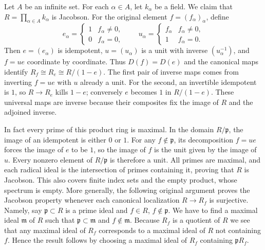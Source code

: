 \begin{example}
\label{editorial-source-example-infinite-product-fields-jacobson}
Let $A$ be an infinite set.
For each $\alpha \in A$, let $k_\alpha$ be a field.
We claim that $R = \prod_{\alpha\in A} k_\alpha$ is Jacobson.
For the original element $f=(f_\alpha)_\alpha$, define
$$
e_\alpha=\begin{cases}1&f_\alpha\ne0,\\0&f_\alpha=0,\end{cases}
\qquad
u_\alpha=\begin{cases}f_\alpha&f_\alpha\ne0,\\1&f_\alpha=0.\end{cases}
$$
Then $e=(e_\alpha)$ is idempotent, $u=(u_\alpha)$ is a unit with
inverse $(u_\alpha^{-1})$, and $f=ue$ coordinate by coordinate.
Thus $D(f)=D(e)$ and the canonical maps identify
$R_f\cong R_e\cong R/(1-e)$. The first pair of inverse maps comes
from inverting $f=ue$ with $u$ already a unit. For the second, an
invertible idempotent is $1$, so $R\to R_e$ kills $1-e$; conversely
$e$ becomes $1$ in $R/(1-e)$. These universal maps are inverse
because their composites fix the image of $R$ and the adjoined inverse.

In fact every prime of this product ring is maximal. In the domain
$R/\mathfrak p$, the image of an idempotent is either $0$ or $1$.
For any $f\notin\mathfrak p$, its decomposition $f=ue$ forces the
image of $e$ to be $1$, so the image of $f$ is the unit given by
the image of $u$. Every nonzero element of $R/\mathfrak p$ is
therefore a unit. All primes are maximal, and each radical ideal
is the intersection of primes containing it, proving that $R$ is Jacobson.
This also covers finite index sets and the empty product, whose
spectrum is empty. More generally, the following original argument
proves the Jacobson property whenever each canonical localization
$R\to R_f$ is surjective.
Namely, say $\mathfrak p \subset R$ is a prime ideal
and $f \in R$, $f \not \in \mathfrak p$. We have to find
a maximal ideal $\mathfrak m$ of $R$ such that
$\mathfrak p \subset \mathfrak m$ and $f \not\in \mathfrak m$.
Because $R_f$ is a quotient of $R$ we see that any maximal
ideal of $R_f$ corresponds to a maximal ideal of $R$
not containing $f$. Hence the result follows
by choosing a maximal ideal of $R_f$ containing $\mathfrak p R_f$.
\end{example}
